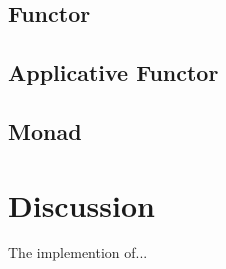 \documentclass[12pt,fleqn]{article}
\begin{document}
\subsection{Functor}

\subsection{Applicative Functor}

\subsection{Monad}


\section{Discussion}

 The implemention of...
\end{document}
